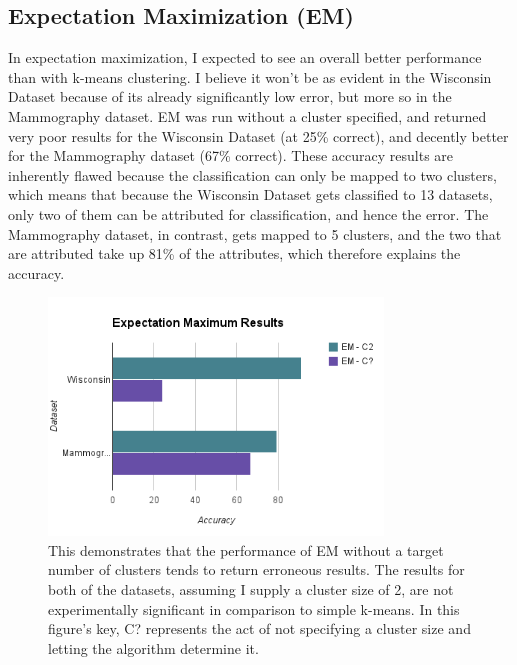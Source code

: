 \documentclass[annual]{acmsiggraph}
\begin{document}
\subsection{Expectation Maximization (EM)}
In expectation maximization, I expected to see an overall better performance than with k-means clustering. I believe it won't be as evident in the Wisconsin Dataset because of its already significantly low error, but more so in the Mammography dataset. EM was run without a cluster specified, and returned very poor results for the Wisconsin Dataset (at 25\% correct), and decently better for the Mammography dataset (67\% correct). These accuracy results are inherently flawed because the classification can only be mapped to two clusters, which means that because the Wisconsin Dataset gets classified to 13 datasets, only two of them can be attributed for classification, and hence the error. The Mammography dataset, in contrast, gets mapped to 5 clusters, and the two that are attributed take up 81\% of the attributes, which therefore explains the accuracy.
\begin{figure}[ht]
  \centering
  \includegraphics[width=3.5in]{charts/em_result.png}
  \caption{This demonstrates that the performance of EM without a target number of clusters tends to return erroneous results. The results for both of the datasets, assuming I supply a cluster size of 2, are not experimentally significant in comparison to simple k-means. In this figure's key, C? represents the act of not specifying a cluster size and letting the algorithm determine it.}
  \label{fig:clust2}
\end{figure}
\end{document}
